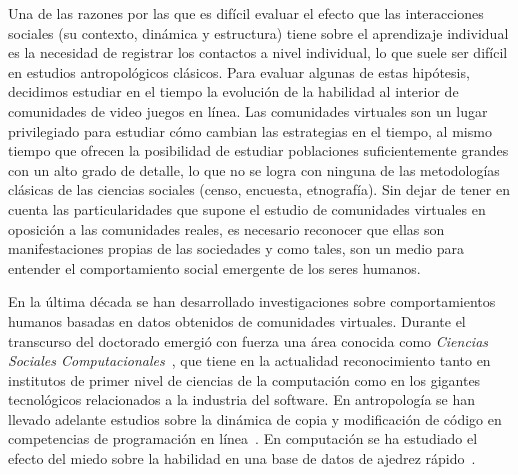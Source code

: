 \documentclass[a4paper,11pt]{book}
\theoremstyle{definition}
\begin{document}

Una de las razones por las que es dif\'icil evaluar el efecto que las interacciones sociales (su contexto, din\'amica y estructura) tiene sobre el aprendizaje individual es la necesidad de registrar los contactos a nivel individual, lo que suele ser dif\'icil en estudios antropol\'ogicos cl\'asicos.
%
Para evaluar algunas de estas hip\'otesis, decidimos estudiar en el tiempo la evoluci\'on de la habilidad al interior de comunidades de video juegos en l\'inea.
%
Las comunidades virtuales son un lugar privilegiado para estudiar c\'omo cambian las estrategias en el tiempo, al mismo tiempo que ofrecen la posibilidad de estudiar poblaciones suficientemente grandes con un alto grado de detalle, lo que no se logra con ninguna de las metodolog\'ias cl\'asicas de las ciencias sociales (censo, encuesta, etnograf\'ia).
%
Sin dejar de tener en cuenta las particularidades que supone el estudio de comunidades virtuales en oposici\'on a las comunidades reales, es necesario reconocer que ellas son manifestaciones propias de las sociedades y como tales, son un medio para entender el comportamiento social emergente de los seres humanos.
%


En la \'ultima d\'ecada se han desarrollado investigaciones sobre comportamientos humanos basadas en datos obtenidos de comunidades virtuales.
%
Durante el transcurso del doctorado emergi\'o con fuerza una \'area conocida como \emph{Ciencias Sociales Computacionales}~\cite{Lazer2009,Lazer2020}, que tiene en la actualidad reconocimiento tanto en institutos de primer nivel de ciencias de la computaci\'on como en los gigantes tecnol\'ogicos relacionados a la industria del software.
%
En antropolog\'ia se han llevado adelante estudios sobre la din\'amica de copia y modificaci\'on de c\'odigo en competencias de programaci\'on en l\'inea~\cite{miu2018-cumulativeCultureOnlineProgrammingContests}.
%
En computaci\'on se ha estudiado el efecto del miedo sobre la habilidad en una base de datos de ajedrez r\'apido~\cite{slezak2012-doNotFearYourOpponent}.
\end{document}
